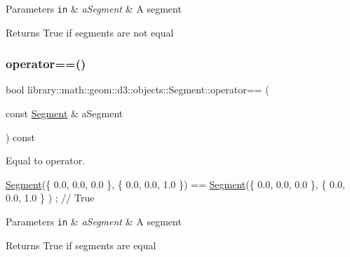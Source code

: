 \begin{DoxyParams}[1]{Parameters}
\mbox{\tt in}  & {\em a\+Segment} & A segment \\
\hline
\end{DoxyParams}
\begin{DoxyReturn}{Returns}
True if segments are not equal 
\end{DoxyReturn}
\mbox{\label{classlibrary_1_1math_1_1geom_1_1d3_1_1objects_1_1_segment_af6b462e74438f79ec6162fdefdfcb887}} 
\subsubsection{\texorpdfstring{operator==()}{operator==()}}
{\footnotesize\ttfamily bool library\+::math\+::geom\+::d3\+::objects\+::\+Segment\+::operator== (\begin{DoxyParamCaption}\item[{const \hyperlink{classlibrary_1_1math_1_1geom_1_1d3_1_1objects_1_1_segment}{Segment} \&}]{a\+Segment }\end{DoxyParamCaption}) const}



Equal to operator. 


\begin{DoxyCode}
\hyperlink{classlibrary_1_1math_1_1geom_1_1d3_1_1objects_1_1_segment_a5562342d1edf2f52e37ce1bc138ee7d7}{Segment}(\{ 0.0, 0.0, 0.0 \}, \{ 0.0, 0.0, 1.0 \}) == \hyperlink{classlibrary_1_1math_1_1geom_1_1d3_1_1objects_1_1_segment_a5562342d1edf2f52e37ce1bc138ee7d7}{Segment}(\{ 0.0, 0.0, 0.0 \}, \{ 0.0, 0.0, 1.0 \}
      ) ; \textcolor{comment}{// True}
\end{DoxyCode}



\begin{DoxyParams}[1]{Parameters}
\mbox{\tt in}  & {\em a\+Segment} & A segment \\
\hline
\end{DoxyParams}
\begin{DoxyReturn}{Returns}
True if segments are equal 
\end{DoxyReturn}
\mbox{\label{classlibrary_1_1math_1_1geom_1_1d3_1_1objects_1_1_segment_a2d3c1a17842ee4ee83cffda33911291d}} 
